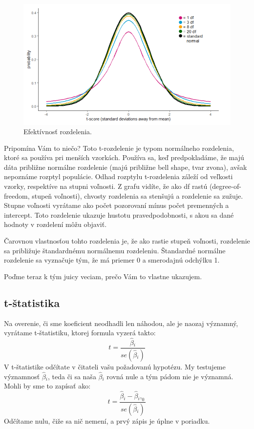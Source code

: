\begin{figure}
\begin{center}

\includegraphics{diplomka obrazky/7.png}
\caption{Efektívnosť rozdelenia.}
\end{center}
\end{figure}

Pripomína Vám to niečo? Toto t-rozdelenie je typom normálneho
rozdelenia, ktoré sa používa pri menších vzorkách. Používa sa, keď
predpokladáme, že majú dáta približne normálne rozdelenie (majú
približne bell shape, tvar zvona), avšak nepoznáme rozptyl populácie.
Odhad rozptylu t-rozdelenia záleží od veľkosti vzorky, respektíve na
stupni voľnosti. Z grafu vidíte, že ako df rastú (degree-of-freedom,
stupeň voľnosti), chvosty rozdelenia sa stenšujú a rozdelenie sa zužuje.
Stupne voľnosti vyrátame ako počet pozorovaní mínus počet premenných a
intercept. Toto rozdelenie ukazuje hustotu pravedpodobnosti, s akou sa
dané hodnoty v rozdelení môžu objaviť.

Čarovnou vlastnosťou tohto rozdelenia je, že ako rastie stupeň voľnosti,
rozdelenie sa približuje štandardnému normálnemu rozdeleniu. Štandardné
normálne rozdelenie sa vyznačuje tým, že má priemer 0 a smerodajnú
odchýlku 1.

Poďme teraz k tým juicy veciam, prečo Vám to vlastne ukazujem.

\hypertarget{t-ux161tatistika}{%
\subsection{t-štatistika}\label{t-ux161tatistika}}

Na overenie, či sme koeficient neodhadli len náhodou, ale je naozaj
významný, vyrátame t-štatistiku, ktorej formula vyzerá takto:
\[t = \frac{\hat\beta{}_i}{se(\hat\beta{}_i)}\] V t-štatistike odčítate
v čitateli vašu požadovanú hypotézu. My testujeme významnosť
\(\hat\beta{}_i\), teda či sa naša \(\hat\beta{}_i\) rovná nule a tým
pádom nie je významná. Mohli by sme to zapísať ako:
\[t = \frac{\hat\beta{}_i - \hat\beta{}_i,_0}{se(\hat\beta{}_i)}\]
Odčítame nulu, čiže sa nič nemení, a prvý zápis je úplne v poriadku.

